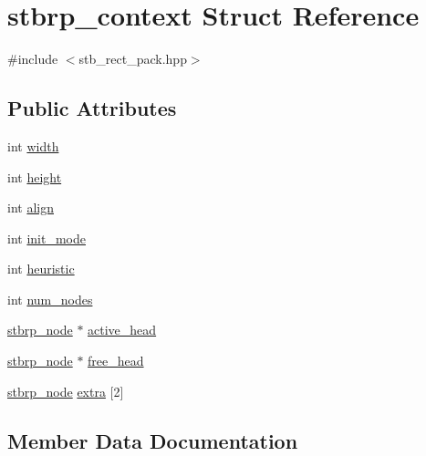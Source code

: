 \hypertarget{structstbrp__context}{}\section{stbrp\+\_\+context Struct Reference}
\label{structstbrp__context}


{\ttfamily \#include $<$stb\+\_\+rect\+\_\+pack.\+hpp$>$}

\subsection*{Public Attributes}
\begin{DoxyCompactItemize}
\item 
int \hyperlink{structstbrp__context_a70cfcb2044ce8397cc440d28b30c09b2}{width}
\item 
int \hyperlink{structstbrp__context_af3715a6f3faecfb4fac8f6ccbb71f9c7}{height}
\item 
int \hyperlink{structstbrp__context_ae36053e2001a725aec2b5756dc990481}{align}
\item 
int \hyperlink{structstbrp__context_a007509feee322404083034e4c2d3dc5d}{init\+\_\+mode}
\item 
int \hyperlink{structstbrp__context_a4b61a7f94e50a54c075e2a8f99f6503a}{heuristic}
\item 
int \hyperlink{structstbrp__context_afa8105d4ef6d3e0ae5aaf8e1ed4b2c58}{num\+\_\+nodes}
\item 
\hyperlink{structstbrp__node}{stbrp\+\_\+node} $\ast$ \hyperlink{structstbrp__context_a13277239636803aff28f00b0a0376120}{active\+\_\+head}
\item 
\hyperlink{structstbrp__node}{stbrp\+\_\+node} $\ast$ \hyperlink{structstbrp__context_a1336ae32373663847866cc65904c2839}{free\+\_\+head}
\item 
\hyperlink{structstbrp__node}{stbrp\+\_\+node} \hyperlink{structstbrp__context_a0b80e1fbdac125427526f3500d4e7624}{extra} \mbox{[}2\mbox{]}
\end{DoxyCompactItemize}


\subsection{Member Data Documentation}
\hypertarget{structstbrp__context_a13277239636803aff28f00b0a0376120}{}\label{structstbrp__context_a13277239636803aff28f00b0a0376120} 
